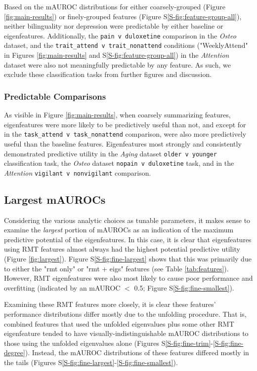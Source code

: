 \documentclass[12pt]{spieman}  %
\newcommand{\code}[1]{\small\texttt{#1}\normalsize}
\begin{document}
\begin{spacing}{2}
Based on the mAUROC distributions for either coarsely-grouped (Figure
\ref{fig:main-results}) or finely-grouped features (Figure
S\ref{S-fig:feature-group-all}), neither bilinguality nor depression were
predictable by either baseline or eigenfeatures. Additionally, the \code{pain v
duloxetine} comparison in the \textit{Osteo} dataset, and the
\code{trait\_attend v trait\_nonattend} conditions ("WeeklyAttend" in Figures
\ref{fig:main-results} and S\ref{S-fig:feature-group-all}) in the \textit{Attention}
dataset were also not meaningfully predictable by any feature. As such, we exclude
these classification tasks from further figures and discussion.


\subsubsection{Predictable Comparisons}
As visible in Figure \ref{fig:main-results}, when coarsely summarizing
features, eigenfeatures were more likely to be predictively useful than not,
and except for in the \code{task\_attend v task\_nonattend} comparison, were
also more predictively useful than the baseline features.  Eigenfeatures most
strongly and consistently demonstrated predictive utility in the \textit{Aging}
dataset \code{older v younger} classification task, the \textit{Osteo} dataset
\code{nopain v duloxetine} task, and in the \textit{Attention} \code{vigilant v
nonvigilant} comparison.


\subsection{Largest mAUROCs}
\label{sec:unfolding-importance}
Considering the various analytic choices as tunable parameters, it makes sense
to examine the \textit{largest} portion of mAUROCs as an indication of the
maximum predictive potential of the eigenfeatures. In this case, it is clear
that eigenfeatures using RMT features almost always had the highest potential
predictive utility (Figure \ref{fig:largest}). Figure S\ref{S-fig:fine-largest}
shows that this was primarily due to either the "rmt only" or "rmt + eigs"
features (see Table \ref{tab:features}). However, RMT eigenfeatures were also most
likely to cause poor performance and overfitting (indicated by an mAUROC \(<\)
0.5; Figure S\ref{S-fig:fine-smallest}).

Examining these RMT features more closely, it is clear these features'
performance distributions differ mostly due to the unfolding procedure. That
is, combined features that used the unfolded eigenvalues plus some other RMT
eigenfeature tended to have visually-indistinguishable mAUROC distributions to
those using the unfolded eigenvalues alone (Figures
S\ref{S-fig:fine-trim}-\ref{S-fig:fine-degree}). Instead, the mAUROC
distributions of these features differed mostly in the tails (Figures
S\ref{S-fig:fine-largest}-\ref{S-fig:fine-smallest}).



\end{spacing}
\end{document}
